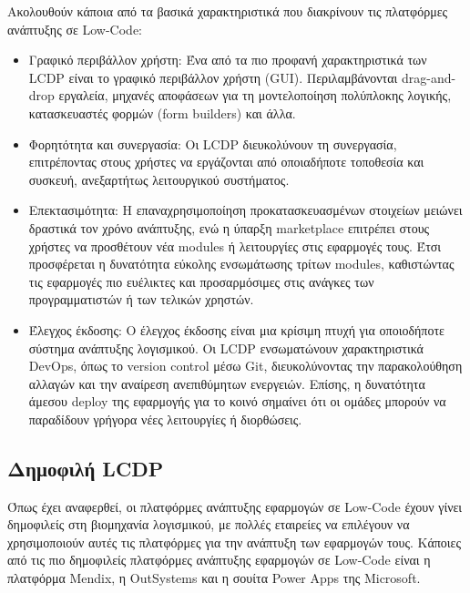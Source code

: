             Ακολουθούν κάποια από τα βασικά χαρακτηριστικά που διακρίνουν τις πλατφόρμες ανάπτυξης σε Low-Code:

            \begin{itemize}[label={\tiny \blacksquare}]
                \setlength\itemsep{-0.25em}
                \item Γραφικό περιβάλλον χρήστη: Ένα από τα πιο προφανή χαρακτηριστικά των LCDP είναι το γραφικό περιβάλλον χρήστη (GUI). Περιλαμβάνονται drag-and-drop εργαλεία, μηχανές αποφάσεων για τη μοντελοποίηση πολύπλοκης λογικής, κατασκευαστές φορμών (form builders) και άλλα.

                \item Φορητότητα και συνεργασία: Οι LCDP διευκολύνουν τη συνεργασία, επιτρέποντας στους χρήστες να εργάζονται από οποιαδήποτε τοποθεσία και συσκευή, ανεξαρτήτως λειτουργικού συστήματος.

                \item Επεκτασιμότητα: Η επαναχρησιμοποίηση προκατασκευασμένων στοιχείων μειώνει δραστικά τον χρόνο ανάπτυξης, ενώ η ύπαρξη marketplace επιτρέπει στους χρήστες να προσθέτουν νέα modules ή λειτουργίες στις εφαρμογές τους. Έτσι προσφέρεται η δυνατότητα εύκολης ενσωμάτωσης τρίτων modules, καθιστώντας τις εφαρμογές πιο ευέλικτες και προσαρμόσιμες στις ανάγκες των προγραμματιστών ή των τελικών χρηστών.

                \item Έλεγχος έκδοσης: Ο έλεγχος έκδοσης είναι μια κρίσιμη πτυχή για οποιοδήποτε σύστημα ανάπτυξης λογισμικού. Οι LCDP ενσωματώνουν χαρακτηριστικά DevOps, όπως το version control μέσω Git, διευκολύνοντας την παρακολούθηση αλλαγών και την αναίρεση ανεπιθύμητων ενεργειών. Επίσης, η δυνατότητα άμεσου deploy της εφαρμογής για το κοινό σημαίνει ότι οι ομάδες μπορούν να παραδίδουν γρήγορα νέες λειτουργίες ή διορθώσεις.
            \end{itemize}

        \subsection{Δημοφιλή LCDP}
            Όπως έχει αναφερθεί, οι πλατφόρμες ανάπτυξης εφαρμογών σε Low-Code έχουν γίνει δημοφιλείς στη βιομηχανία λογισμικού, με πολλές εταιρείες να επιλέγουν να χρησιμοποιούν αυτές τις πλατφόρμες για την ανάπτυξη των εφαρμογών τους. Κάποιες από τις πιο δημοφιλείς πλατφόρμες ανάπτυξης εφαρμογών σε Low-Code είναι η πλατφόρμα Mendix, η OutSystems και η σουίτα Power Apps της Microsoft.

